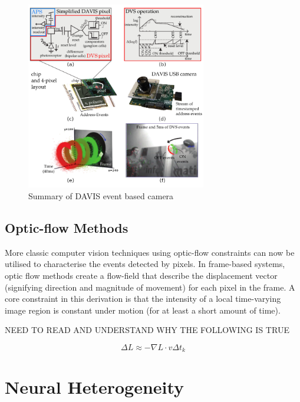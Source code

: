 \begin{figure}[htb]
      \centering
      \includegraphics[width=0.7\textwidth]{background/images/davis_camera.png}
      \caption{Summary of DAVIS event based camera\cite{EventBasedVisionASurvery}}
      \label{fig:davis_camera}
\end{figure}

\subsection{Optic-flow Methods}

More classic computer vision techniques using optic-flow constraints can now be utilised to characterise the events detected by pixels. In frame-based systems, optic flow methods create a flow-field that describe the displacement vector (signifying direction and magnitude of movement) for each pixel in the frame. A core constraint in this derivation is that the intensity of a local time-varying image region is constant under motion (for at least a short amount of time)\cite{GenerativeEventModel}.

\color{red} NEED TO READ AND UNDERSTAND WHY THE FOLLOWING IS TRUE \cite{GenerativeEventModel} \cite{EventBasedVisionASurvery} \color{black}

$$ \Delta L \approx -\nabla L \cdot v \Delta t_k $$

\section{Neural Heterogeneity}

